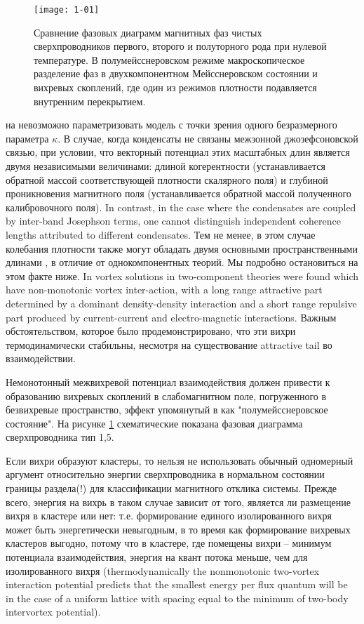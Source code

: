 \begin{figure}[h!]
  \texttt{[image: 1-01]}
  \caption{Сравнение фазовых диаграмм магнитных фаз чистых сверхпроводников
    первого, второго и полуторного рода при нулевой температуре. В 
    полумейсснеровском режиме макроскопическое разделение фаз в 
    двухкомпонентном Мейсснеровском состоянии и вихревых скоплений, где один 
    из режимов плотности подавляется внутренним перекрытием.}
  \label{fig:1}
\end{figure}

на невозможно параметризовать модель с точки зрения одного безразмерного 
параметра \( \kappa \). В случае, когда конденсаты не связаны межзонной 
джозефсоновской связью, при условии, что векторный потенциал этих масштабных 
длин является двумя независимыми величинами: длиной когерентности 
(устанавливается обратной массой соответствующей плотности скалярного поля) и 
глубиной проникновения магнитного поля (устанавливается обратной массой 
полученного калибровочного поля). In contrast, in the 
case where the condensates are coupled by inter-band Josephson terms, one 
cannot distinguish independent coherence lengths attributed to different 
condensates. Тем не менее, в этом случае колебания плотности также могут 
обладать двумя основными пространственными длинами \cite{bib:2}, в отличие от 
однокомпонентных теорий. Мы подробно остановиться на этом факте ниже. In 
\cite{bib:1,bib:2} vortex 
solutions in two-component theories were found which have non-monotonic 
vortex inter-action, with a long range attractive part determined by a 
dominant density-density interaction and a short range repulsive part produced 
by current-current and electro-magnetic interactions. Важным обстоятельством, 
которое было продемонстрировано, что эти вихри термодинамически стабильны, 
несмотря на существование attractive tail во взаимодействии.

Немонотонный межвихревой потенциал взаимодействия должен привести к 
образованию вихревых скоплений в слабомагнитном поле, погруженного в 
безвихревые пространство, эффект упомянутый в \cite{bib:1} как 
"полумейсснеровское состояние". На рисунке \ref{fig:1} схематические показана 
фазовая диаграмма сверхпроводника тип 1,5.

Если вихри образуют кластеры, то нельзя не использовать обычный одномерный 
аргумент относительно энергии сверхпроводника в нормальном состоянии границы 
раздела(!) для классификации магнитного отклика системы. Прежде всего, энергия 
на вихрь в таком случае зависит от того, является ли размещение вихря в 
кластере или нет: т.е. формирование единого изолированного вихря может быть 
энергетически невыгодным, в то время как формирование вихревых кластеров 
выгодно, потому что в кластере, где помещены вихри -- минимум потенциала 
взаимодействия, энергия на квант потока меньше, чем для изолированного вихря
(thermodynamically the nonmonotonic two-vortex interaction potential predicts 
that the smallest energy per flux quantum will be in the case of a uniform 
lattice with spacing equal to the minimum of two-body intervortex potential).


